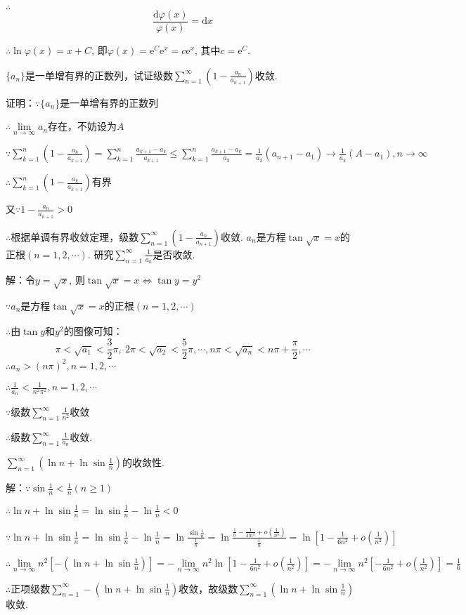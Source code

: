 \documentclass[12pt,UTF8]{ctexart}
\newcommand\Lim[0]{\lim\limits_{n\rightarrow\infty}}
\newcommand\Ser[1]{\sum_{n=#1}^\infty}
\newcommand{\varSer}[3]{\sum_{#1=#2}^{#3}}
\newcommand{\me}[0]{\mathrm e}
\begin{document}
\begin{enumerate}
$\therefore$
\[\frac{\mathrm d\varphi(x)}{\varphi(x)}=\mathrm dx\]

$\therefore\ln\varphi(x)=x+C$, 即$\varphi(x)=\me^C\me^x=c\me^x$, 其中$c=\me^C$.

$\{a_n\}$是一单增有界的正数列，试证级数$\Ser{1}(1-\frac{a_n}{a_{n+1}})$收敛.

证明：$\because\{a_n\}$是一单增有界的正数列

$\therefore\Lim a_n$存在，不妨设为$A$

$\because\varSer k1n(1-\frac{a_k}{a_{k+1}})=\varSer k1n\frac{a_{k+1}-a_k}{a_{k+1}}\leq\varSer k1n\frac{a_{k+1}-a_k}{a_2}=\frac1{a_2}(a_{n+1}-a_1)\rightarrow\frac1{a_2}(A-a_1),n\rightarrow\infty$

$\therefore\varSer k1n(1-\frac{a_k}{a_{k+1}})$有界

又$\because1-\frac{a_n}{a_{n+1}}>0$

$\therefore$根据单调有界收敛定理，级数$\Ser{1}(1-\frac{a_n}{a_{n+1}})$收敛.
$a_n$是方程$\tan\sqrt x=x$的正根$(n=1,2,\cdots)$. 研究$\Ser{1}\frac1{a_n}$是否收敛.

解：令$y=\sqrt x$, 则$\tan\sqrt x=x\Leftrightarrow\tan y=y^2$

$\because a_n$是方程$\tan\sqrt x=x$的正根$(n=1,2,\cdots)$

$\therefore$由$\tan y$和$y^2$的图像可知：
\[\pi<\sqrt{a_1}<\frac32\pi,\ 2\pi<\sqrt{a_2}<\frac52\pi,\cdots,n\pi<\sqrt{a_n}<n\pi+\frac\pi2,\cdots\]
$\therefore a_n>(n\pi)^2,n=1,2,\cdots$

$\therefore\frac1{a_n}<\frac1{n^2\pi^2},n=1,2,\cdots$

$\because$级数$\Ser1\frac1{n^2}$收敛

$\therefore$级数$\Ser{1}\frac1{a_n}$收敛.

$\Ser{1}(\ln n+\ln\sin\frac1n)$的收敛性.

解：$\because\sin\frac1n<\frac1n(n\geq1)$

$\therefore\ln n+\ln\sin\frac1n=\ln\sin\frac1n-\ln\frac1n<0$

$\because\ln n+\ln\sin\frac1n=\ln\sin\frac1n-\ln\frac1n=\ln\frac{\sin\frac1n}{\frac1n}=\ln\frac{\frac1n-\frac1{3!n^3}+o(\frac1{n^3})}{\frac1n}=\ln[1-\frac1{6n^2}+o(\frac1{n^2})]$

$\therefore\Lim n^2[-(\ln n+\ln\sin\frac1n)]=-\Lim n^2\ln[1-\frac1{6n^2}+o(\frac1{n^2})]=-\Lim n^2[-\frac1{6n^2}+o(\frac1{n^2})]=\frac16$

$\therefore$正项级数$\Ser{1}-(\ln n+\ln\sin\frac1n)$收敛，故级数$\Ser{1}(\ln n+\ln\sin\frac1n)$收敛.


\end{enumerate}
\end{document}
